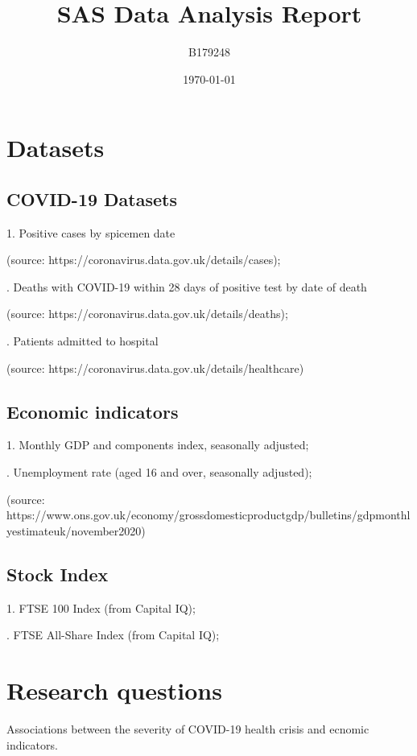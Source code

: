 \documentclass{report}
\title{SAS Data Analysis Report}
\author{B179248}
\date{\today}
\begin{document}
\maketitle

\section{Datasets}
\subsection{COVID-19 Datasets}
1. Positive cases by spicemen date\par
(source: https://coronavirus.data.gov.uk/details/cases);\par
{}. Deaths with COVID-19 within 28 days of positive test by date of death\par
(source: https://coronavirus.data.gov.uk/details/deaths);\par
{}. Patients admitted to hospital\par
(source: https://coronavirus.data.gov.uk/details/healthcare)

\subsection{Economic indicators}
1. Monthly GDP and components index, seasonally adjusted;\par
{}. Unemployment rate (aged 16 and over, seasonally adjusted);\par
(source: https://www.ons.gov.uk/economy/grossdomesticproductgdp/bulletins/gdpmonthlyestimateuk/november2020)

\subsection{Stock Index}
1. FTSE 100 Index (from Capital IQ);\par
{}. FTSE All-Share Index (from Capital IQ);\par

\section{Research questions}
Associations between the severity of COVID-19 health crisis and ecnomic indicators.
\end{document}
